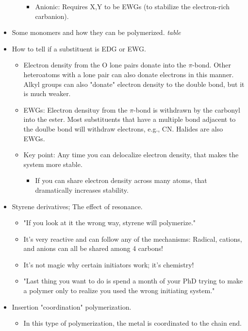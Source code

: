 \documentclass[../notes.tex]{subfiles}
\begin{document}
\begin{itemize}
\begin{itemize}
\begin{itemize}
            \item Anionic: Requires X,Y to be EWGs (to stabilize the electron-rich carbanion).
        \end{itemize}
    \end{itemize}
    \item Some monomers and how they can be polymerized.
    \emph{table}
    \item How to tell if a substituent is EDG or EWG.
    \begin{itemize}
        \item Electron density from the O lone pairs donate into the $\pi$-bond. Other heteroatoms with a lone pair can also donate electrons in this manner. Alkyl groups can also "donate" electron density to the double bond, but it is much weaker.
        \item EWGs: Electron densituy from the $\pi$-bond is withdrawn by the carbonyl into the ester. Most substituents that have a multiple bond adjacent to the doulbe bond will withdraw electrons, e.g., CN. Halides are also EWGs.
        \item Key point: Any time you can delocalize electron density, that makes the system more stable.
        \begin{itemize}
            \item If you can share electron density across many atoms, that dramatically increases stability.
        \end{itemize}
    \end{itemize}
    \item Styrene derivatives; The effect of resonance.
    \begin{itemize}
        \item "If you look at it the wrong way, styrene will polymerize."
        \item It's very reactive and can follow any of the mechanisms: Radical, cations, and anions can all be shared among 4 carbons!
        \item It's not magic why certain initiators work; it's chemistry!
        \item "Last thing you want to do is spend a month of your PhD trying to make a polymer only to realize you used the wrong initiating system."
    \end{itemize}
    \item Insertion "coordination" polymerization.
    \begin{itemize}
        \item In this type of polymerization, the metal is coordinated to the chain end.

\end{itemize}
\end{itemize}
\end{document}
